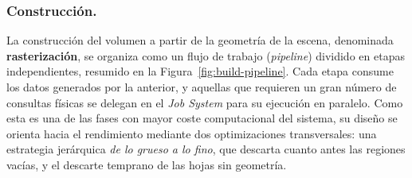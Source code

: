 \subsubsection{Construcción.}

La construcción del volumen a partir de la geometría de la escena, denominada \textbf{rasterización}, se organiza como un flujo de trabajo (\textit{pipeline}) dividido en etapas independientes, resumido en la Figura~\ref{fig:build-pipeline}.
Cada etapa consume los datos generados por la anterior, y aquellas que requieren un gran número de consultas físicas se delegan en el \textit{Job System} para su ejecución en paralelo.
Como esta es una de las fases con mayor coste computacional del sistema, su diseño se orienta hacia el rendimiento mediante dos optimizaciones transversales: una estrategia jerárquica \textit{de lo grueso a lo fino}, que descarta cuanto antes las regiones vacías, y el descarte temprano de las hojas sin geometría.


